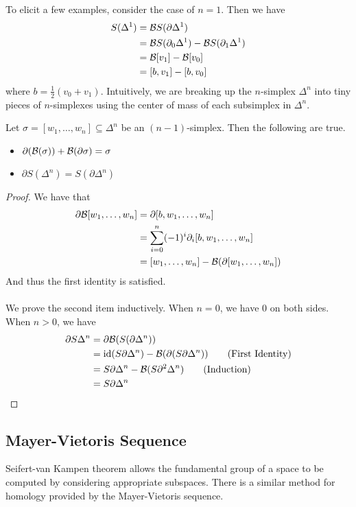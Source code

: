 \documentclass[a4paper]{article}
\begin{document}
To elicit a few examples, consider the case of $n=1$. Then we have 
\begin{align*}
S(\Delta^1)&=\mathcal{B} S(\partial\Delta^1)\\
&=\mathcal{B} S(\partial_0\Delta^1)-\mathcal{B} S(\partial_1\Delta^1)\\
&=\mathcal{B}[v_1]-\mathcal{B}[v_0]\\
&=[b,v_1]-[b,v_0]
\end{align*}
where $b=\frac{1}{2}(v_0+v_1)$. Intuitively, we are breaking up the $n$-simplex $\Delta^n$ into tiny pieces of $n$-simplexes using the center of mass of each subsimplex in $\Delta^n$. 

\begin{lmm}{}{} Let $\sigma=[w_1,\dots,w_n]\subseteq\Delta^n$ be an $(n-1)$-simplex. Then the following are true. 
\begin{itemize}
\item $\partial(\mathcal{B}(\sigma))+\mathcal{B}(\partial\sigma)=\sigma$ 
\item $\partial S(\Delta^n)=S(\partial\Delta^n)$
\end{itemize} \tcbline
\begin{proof}
We have that 
\begin{align*}
\partial\mathcal{B}[w_1,\dots,w_n]&=\partial[b,w_1,\dots,w_n]\\
&=\sum_{i=0}^n(-1)^i\partial_i[b,w_1,\dots,w_n]\\
&=[w_1,\dots,w_n]-\mathcal{B}(\partial[w_1,\dots,w_n])
\end{align*}
And thus the first identity is satisfied. \\~\\
We prove the second item inductively. When $n=0$, we have $0$ on both sides. When $n>0$, we have
\begin{align*}
\partial S\Delta^n&=\partial\mathcal{B}(S(\partial\Delta^n))\\
&=\text{id}(S\partial\Delta^n)-\mathcal{B}(\partial(S\partial\Delta^n))\tag{First Identity}\\
&=S\partial\Delta^n-\mathcal{B}(S\partial^2\Delta^n)\tag{Induction}\\
&=S\partial\Delta^n
\end{align*}
\end{proof}
\end{lmm}

\subsection{Mayer-Vietoris Sequence}
Seifert-van Kampen theorem allows the fundamental group of a space to be computed by considering appropriate subspaces. There is a similar method for homology provided by the Mayer-Vietoris sequence. \\~\\
\end{document}
